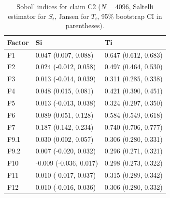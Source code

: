 \begin{table}[ht]
\centering
\caption{Sobol' indices for claim C2 ($N=4096$, Saltelli estimator for $S_i$, Jansen for $T_i$, 95\% bootstrap CI in parentheses).} 
\label{tab:sobol_C2}
\begin{tabular}{lll}
  \hline
Factor & Si & Ti \\ 
  \hline
F1 & 0.047 (0.007, 0.088) & 0.647 (0.612, 0.683) \\ 
  F2 & 0.024 (-0.012, 0.058) & 0.497 (0.464, 0.530) \\ 
  F3 & 0.013 (-0.014, 0.039) & 0.311 (0.285, 0.338) \\ 
  F4 & 0.048 (0.015, 0.081) & 0.421 (0.390, 0.451) \\ 
  F5 & 0.013 (-0.013, 0.038) & 0.324 (0.297, 0.350) \\ 
  F6 & 0.089 (0.051, 0.128) & 0.584 (0.549, 0.618) \\ 
  F7 & 0.187 (0.142, 0.234) & 0.740 (0.706, 0.777) \\ 
  F9.1 & 0.030 (0.002, 0.057) & 0.306 (0.280, 0.331) \\ 
  F9.2 & 0.007 (-0.020, 0.032) & 0.296 (0.271, 0.321) \\ 
  F10 & -0.009 (-0.036, 0.017) & 0.298 (0.273, 0.322) \\ 
  F11 & 0.010 (-0.017, 0.037) & 0.315 (0.289, 0.342) \\ 
  F12 & 0.010 (-0.016, 0.036) & 0.306 (0.280, 0.332) \\ 
   \hline
\end{tabular}
\end{table}
